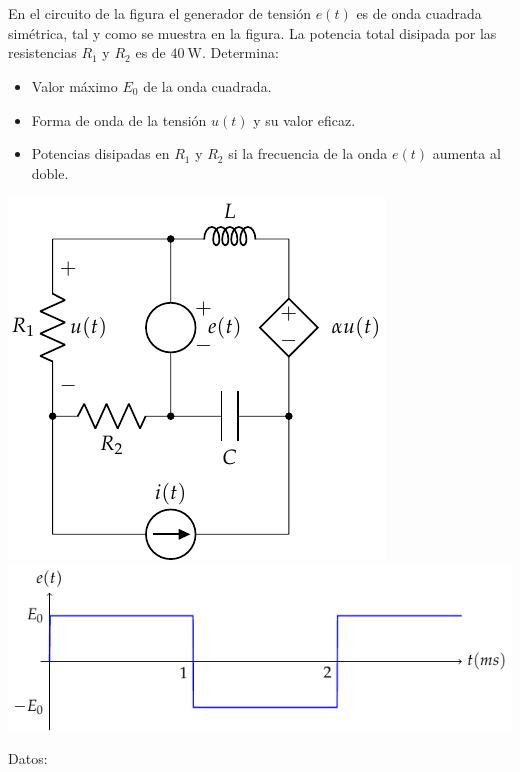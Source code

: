 \documentclass[12pt]{article}
\begin{document}
\noindent\hrulefill

\clearpage

\section{}

En el circuito de la figura el generador de tensión $e(t)$ es de onda cuadrada simétrica, tal y como se muestra en la figura. La potencia total disipada por las resistencias $R_1$ y $R_2$ es de $\SI{40}{\watt}$.
Determina:

\begin{itemize}
  \item Valor máximo $E_0$ de la onda cuadrada.
  \item Forma de onda de la tensión $u(t)$ y su valor eficaz.
  \item Potencias disipadas en $R_1$ y $R_2$ si la frecuencia de la onda $e(t)$ aumenta al doble.
\end{itemize}

\begin{center}
  \includegraphics{figs/superposicion3}
  \includegraphics{figs/superposicionOndaCuadrada}
\end{center}
Datos:
\end{document}
